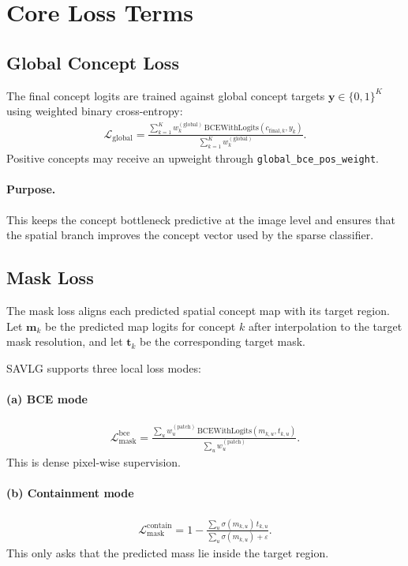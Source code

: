 \documentclass[11pt]{article}
\begin{document}
\section{Core Loss Terms}

\subsection{Global Concept Loss}
The final concept logits are trained against global concept targets
$\bm{y} \in \{0,1\}^K$ using weighted binary cross-entropy:
\begin{align}
\mathcal{L}_{\mathrm{global}}
=
\frac{
\sum_{k=1}^{K}
w_k^{(\mathrm{global})}
\,
\mathrm{BCEWithLogits}(c_{\mathrm{final},k}, y_k)
}{
\sum_{k=1}^{K} w_k^{(\mathrm{global})}
}.
\end{align}
Positive concepts may receive an upweight through
\texttt{global\_bce\_pos\_weight}.

\paragraph{Purpose.}
This keeps the concept bottleneck predictive at the image level and ensures that
the spatial branch improves the concept vector used by the sparse classifier.

\subsection{Mask Loss}
The mask loss aligns each predicted spatial concept map with its target region.
Let $\bm{m}_k$ be the predicted map logits for concept $k$ after interpolation to
the target mask resolution, and let $\bm{t}_k$ be the corresponding target mask.

SAVLG supports three local loss modes:

\paragraph{(a) BCE mode}
\begin{align}
\mathcal{L}_{\mathrm{mask}}^{\mathrm{bce}}
=
\frac{
\sum_{u}
w_u^{(\mathrm{patch})}
\,
\mathrm{BCEWithLogits}(m_{k,u}, t_{k,u})
}{
\sum_{u} w_u^{(\mathrm{patch})}
}.
\end{align}
This is dense pixel-wise supervision.

\paragraph{(b) Containment mode}
\begin{align}
\mathcal{L}_{\mathrm{mask}}^{\mathrm{contain}}
=
1 -
\frac{
\sum_{u} \sigma(m_{k,u}) \, t_{k,u}
}{
\sum_{u} \sigma(m_{k,u}) + \varepsilon
}.
\end{align}
This only asks that the predicted mass lie inside the target region.
\end{document}
